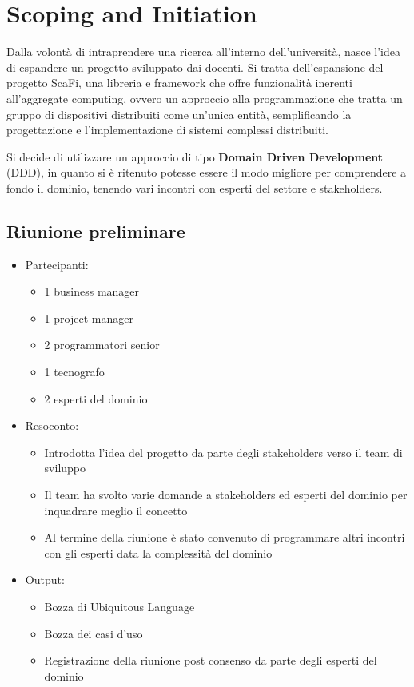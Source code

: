 \section{Scoping and Initiation}


Dalla volontà di intraprendere una ricerca all'interno dell'università, nasce l'idea di espandere un progetto sviluppato dai docenti.
Si tratta dell'espansione del progetto ScaFi, una libreria e framework che offre funzionalità inerenti all'aggregate computing, ovvero un
approccio alla programmazione che tratta un gruppo di dispositivi distribuiti come un'unica entità, semplificando la progettazione e l'implementazione
di sistemi complessi distribuiti.

Si decide di utilizzare un approccio di tipo \textbf{Domain Driven Development} (DDD), in quanto si è ritenuto potesse essere il modo migliore
per comprendere a fondo il dominio, tenendo vari incontri con esperti del settore e stakeholders.

\subsection{Riunione preliminare}
\begin{itemize}
    \item Partecipanti:
          \begin{itemize}
              \item 1 business manager
              \item 1 project manager
              \item 2 programmatori senior
              \item 1 tecnografo
              \item 2 esperti del dominio
          \end{itemize}
    \item Resoconto:
          \begin{itemize}
              \item Introdotta l'idea del progetto da parte degli stakeholders verso il team di sviluppo
              \item Il team ha svolto varie domande a stakeholders ed esperti del dominio per inquadrare meglio il concetto
              \item Al termine della riunione è stato convenuto di programmare altri incontri con gli esperti data la complessità del dominio
          \end{itemize}
    \item Output:
          \begin{itemize}
              \item Bozza di Ubiquitous Language
              \item Bozza dei casi d'uso
              \item Registrazione della riunione post consenso da parte degli esperti del dominio
          \end{itemize}
\end{itemize}


